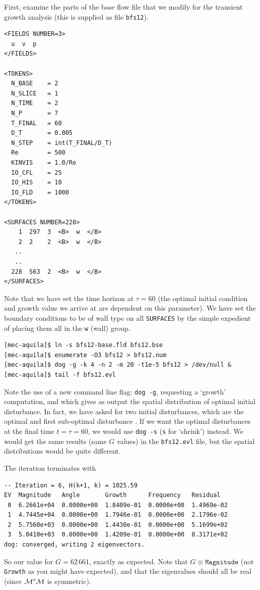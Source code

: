 \documentclass[11pt,a4paper]{report}
\newcommand\Mop{{\cal M}}
\newcommand\Madj{{\cal M^*}}
\begin{document}
First, examine the parts of the base flow file that we modify for the
transient growth analysis (this is supplied as file \verb+bfs12+).
{\small
\begin{verbatim}
<FIELDS NUMBER=3>
  u  v  p
</FIELDS>

<TOKENS>
  N_BASE    = 2
  N_SLICE   = 1
  N_TIME    = 2
  N_P       = 7
  T_FINAL   = 60
  D_T       = 0.005
  N_STEP    = int(T_FINAL/D_T)
  Re        = 500
  KINVIS    = 1.0/Re
  IO_CFL    = 25
  IO_HIS    = 10
  IO_FLD    = 1000
</TOKENS>

<SURFACES NUMBER=228>
    1  297  3  <B>  w  </B>
    2  2    2  <B>  w  </B>
   ..
   ..
  228  563  2  <B>  w  </B>
</SURFACES>
\end{verbatim}
}\noindent Note that we have set the time horizon at $\tau=60$ (the
optimal initial condition and growth value we arrive at are dependent
on this parameter).  We have set the boundary conditions to be of wall
type on all \verb+SURFACES+ by the simple expedient of placing them
all in the \verb+w+ (wall) group.
\begin{verbatim}
[mec-aquila]$ ln -s bfs12-base.fld bfs12.bse
[mec-aquila]$ enumerate -O3 bfs12 > bfs12.num
[mec-aquila]$ dog -g -k 4 -n 2 -m 20 -t1e-5 bfs12 > /dev/null &
[mec-aquila]$ tail -f bfs12.evl
\end{verbatim}
\noindent
Note the use of a new command line flag: \verb+dog -g+, requesting a
`growth' computation, and which gives as output the spatial
distribution of optimal initial disturbance.  In fact, we have asked
for two initial disturbances, which are the optimal and first
sub-optimal disturbance \citep[see \S\,4.2.1 and table~5
  of][]{bbs08a}.  If we want the optimal disturbances at the final
time $t=\tau=60$, we would use \verb+dog -s+ (\verb+s+ for `shrink')
instead.  We would get the same results (same $G$ values) in the
\verb+bfs12.evl+ file, but the spatial distributions would be quite
different.

The iteration terminates with
{\small
\begin{verbatim}
-- Iteration = 6, H(k+1, k) = 1025.59
EV  Magnitude   Angle       Growth      Frequency   Residual
 0  6.2661e+04  0.0000e+00  1.8409e-01  0.0000e+00  1.4969e-02
 1  4.7445e+04  0.0000e+00  1.7946e-01  0.0000e+00  2.1796e-02
 2  5.7560e+03  0.0000e+00  1.4430e-01  0.0000e+00  5.1699e+02
 3  5.0410e+03  0.0000e+00  1.4209e-01  0.0000e+00  8.3171e+02
dog: converged, writing 2 eigenvectors.
\end{verbatim}
}\noindent So our value for $G=62\,661$, exactly as expected.  Note
that $G\equiv\texttt{Magnitude}$ (not \verb+Growth+ as you might have
expected), and that the eigenvalues should all be real (since
$\Madj\Mop$ is symmetric).
\end{document}
